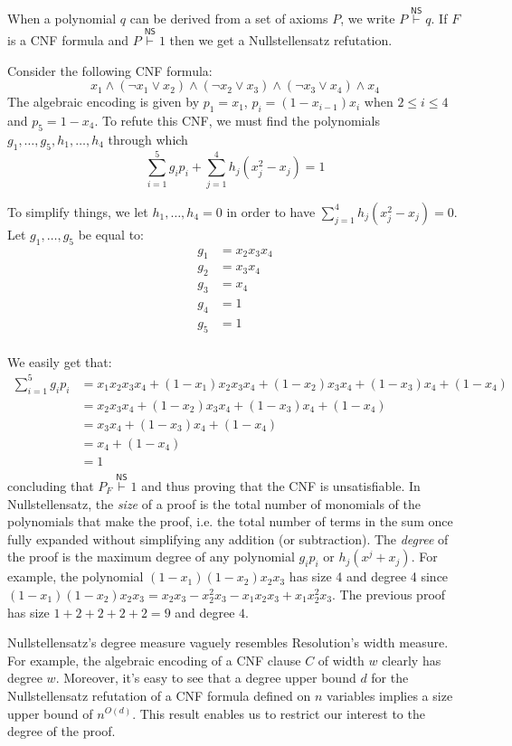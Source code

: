 When a polynomial $q$ can be derived from a set of axioms $P$, we write $P \stackrel{\mathsf{NS}}{\vdash} q$. If $F$ is a CNF formula and $P \stackrel{\mathsf{NS}}{\vdash} 1$ then we get a Nullstellensatz refutation.

Consider the following CNF formula:
\[x_1 \land (\lnot x_1 \lor x_2) \land (\lnot x_2 \lor x_3) \land (\lnot x_3 \lor x_4)\land x_4\]
The algebraic encoding is given by $p_1 = x_1$, $p_i = (1-x_{i-1})x_i$ when $2 \leq i \leq 4$ and $p_5 = 1-x_4$. To refute this CNF, we must find the polynomials $g_1, \ldots, g_5, h_1, \ldots, h_4$ through which
\[\sum_{i = 1}^5 g_ip_{i} + \sum_{j = 1}^4 h_j(x_j^2-x_j) = 1\]

\noindent
To simplify things, we let $h_1, \ldots, h_4 = 0$ in order to have $\sum_{j = 1}^4 h_j(x_j^2-x_j) = 0$. Let $g_1, \ldots, g_5$ be equal to:
\[\begin{split}
 g_1 &= x_2x_3x_4 \\
 g_2 &= x_3x_4 \\
 g_3 &= x_4 \\
 g_4 &= 1 \\
 g_5 &= 1 \\
\end{split}\]

\noindent
We easily get that:
\[\begin{split}
    \sum_{i = 1}^5 g_ip_{i}&= x_1x_2x_3x_4 + (1-x_1)x_2x_3x_4 + (1-x_2)x_3x_4 + (1-x_3)x_4 + (1-x_4)\\
    &= x_2x_3x_4 + (1-x_2)x_3x_4 + (1-x_3)x_4 + (1-x_4)\\
    &= x_3x_4 + (1-x_3)x_4 + (1-x_4)\\
    &= x_4 + (1-x_4)\\
    &= 1\\
\end{split}\]
concluding that $P_F \stackrel{\mathsf{NS}}{\vdash} 1$ and thus proving that the CNF is unsatisfiable. In Nullstellensatz, the \textit{size} of a proof is the total number of monomials of the polynomials that make the proof, i.e. the total number of terms in the sum once fully expanded without simplifying any addition (or subtraction). The \textit{degree} of the proof is the maximum degree of any polynomial $g_ip_i$ or $h_j(x^j+x_j)$. For example, the polynomial $(1-x_1)(1-x_2)x_2x_3$ has size 4 and degree 4 since $(1-x_1)(1-x_2)x_2x_3 = x_2x_3 - x_2^2x_3 - x_1x_2x_3 + x_1x_2^2x_3$. The previous proof has size $1+2+2+2+2 = 9$ and degree $4$.

Nullstellensatz's degree measure vaguely resembles Resolution's width measure. For example, the algebraic encoding of a CNF clause $C$ of width $w$ clearly has degree $w$. Moreover, it's easy to see that a degree upper bound $d$ for the Nullstellensatz refutation of a CNF formula defined on $n$ variables implies a size upper bound of $n^{O(d)}$. This result enables us to restrict our interest to the degree of the proof.

